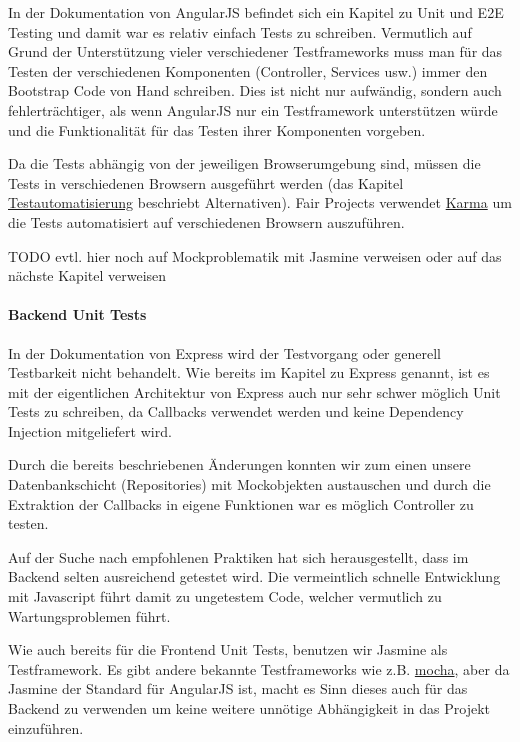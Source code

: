 \documentclass[]{article}
\begin{document}
In der Dokumentation von AngularJS befindet sich ein Kapitel zu Unit und
E2E Testing und damit war es relativ einfach Tests zu schreiben.
Vermutlich auf Grund der Unterstützung vieler verschiedener
Testframeworks muss man für das Testen der verschiedenen Komponenten
(Controller, Services usw.) immer den Bootstrap Code von Hand schreiben.
Dies ist nicht nur aufwändig, sondern auch fehlerträchtiger, als wenn
AngularJS nur ein Testframework unterstützen würde und die
Funktionalität für das Testen ihrer Komponenten vorgeben.

Da die Tests abhängig von der jeweiligen Browserumgebung sind, müssen
die Tests in verschiedenen Browsern ausgeführt werden (das Kapitel
\url{Testautomatisierung} beschriebt Alternativen). Fair Projects
verwendet \href{http://karma-runner.github.io/0.13/index.html}{Karma} um
die Tests automatisiert auf verschiedenen Browsern auszuführen.

TODO evtl. hier noch auf Mockproblematik mit Jasmine verweisen oder auf
das nächste Kapitel verweisen

\paragraph{Backend Unit Tests}\label{backend-unit-tests}

In der Dokumentation von Express wird der Testvorgang oder generell
Testbarkeit nicht behandelt. Wie bereits im Kapitel zu Express genannt,
ist es mit der eigentlichen Architektur von Express auch nur sehr schwer
möglich Unit Tests zu schreiben, da Callbacks verwendet werden und keine
Dependency Injection mitgeliefert wird.

Durch die bereits beschriebenen Änderungen konnten wir zum einen unsere
Datenbankschicht (Repositories) mit Mockobjekten austauschen und durch
die Extraktion der Callbacks in eigene Funktionen war es möglich
Controller zu testen.

Auf der Suche nach empfohlenen Praktiken hat sich herausgestellt, dass
im Backend selten ausreichend getestet wird. Die vermeintlich schnelle
Entwicklung mit Javascript führt damit zu ungetestem Code, welcher
vermutlich zu Wartungsproblemen führt.

Wie auch bereits für die Frontend Unit Tests, benutzen wir Jasmine als
Testframework. Es gibt andere bekannte Testframeworks wie z.B.
\href{https://mochajs.org/}{mocha}, aber da Jasmine der Standard für
AngularJS ist, macht es Sinn dieses auch für das Backend zu verwenden um
keine weitere unnötige Abhängigkeit in das Projekt einzuführen.
\end{document}
